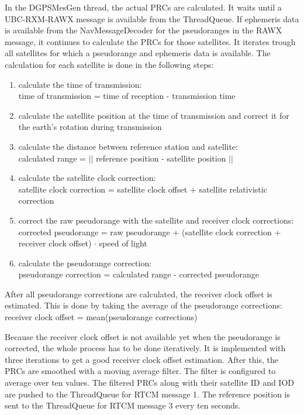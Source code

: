 In the DGPSMesGen thread, the actual PRCs are calculated.
It waits until a UBC-RXM-RAWX message is available from the ThreadQueue.
If ephemeris data is available from the NavMessageDecoder for the pseudoranges in the RAWX message, it continues to calculate the PRCs for those satellites.
It iterates trough all satellites for which a pseudorange and ephemeris data is available.
The calculation for each satellite is done in the following steps:
\begin{enumerate}
 \setlength\itemsep{0.1cm}
 \item calculate the time of transmission: \\
 time of transmission = time of reception - transmission time
 \item calculate the satellite position at the time of transmission and correct it for the earth's rotation during transmission
 \item calculate the distance between reference station and satellite: \\
 calculated range = $\lvert \lvert$ reference position - satellite position $\rvert \rvert$
 \item calculate the satellite clock correction: \\
 satellite clock correction = satellite clock offset + satellite relativistic correction
 \item correct the raw pseudorange with the satellite and receiver clock corrections: \\
 corrected pseudorange = raw pseudorange + (satellite clock correction + receiver clock offset) $\cdot$ speed of light
 \item calculate the pseudorange correction: \\
 pseudorange correction = calculated range - corrected pseudorange
\end{enumerate}
After all pseudorange corrections are calculated, the receiver clock offset is estimated.
This is done by taking the average of the pseudorange corrections: \\
receiver clock offset = mean(pseudorange corrections)

Because the receiver clock offset is not available yet when the pseudorange is corrected, the whole process has to be done iteratively.
It is implemented with three iterations to get a good receiver clock offset estimation.
After this, the PRCs are smoothed with a moving average filter.
The filter is configured to average over ten values.
The filtered PRCs along with their satellite ID and IOD are pushed to the ThreadQueue for RTCM message 1.
The reference position is sent to the ThreadQueue for RTCM message 3 every ten seconds.

